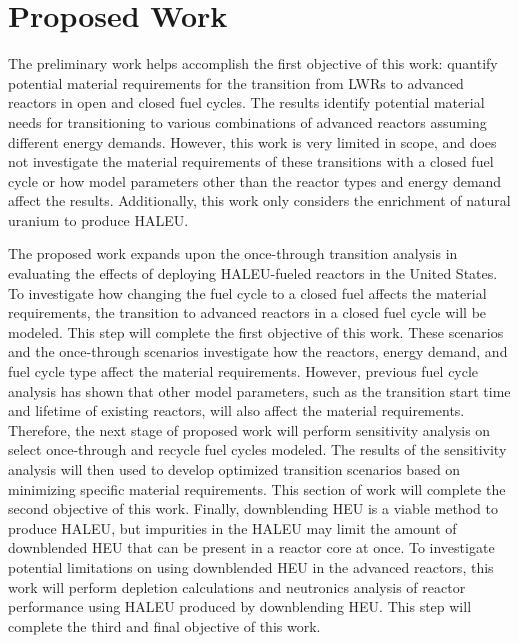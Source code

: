 \section{Proposed Work}
The preliminary work helps accomplish the first objective of this work: 
quantify potential material requirements for the transition from 
\glspl{LWR}
to advanced reactors in open and closed fuel cycles. The results identify 
potential material needs for transitioning to various combinations of 
advanced reactors assuming different energy demands. However, this work 
is very limited in scope, and does not investigate the material requirements 
of these transitions with a closed fuel cycle or how model parameters 
other 
than the reactor types and energy demand affect the results. Additionally, 
this work only considers the enrichment of natural uranium to produce 
\gls{HALEU}. 

The proposed work expands upon the once-through transition analysis in 
evaluating the effects of deploying \gls{HALEU}-fueled reactors in the 
United States. 
To investigate how changing the fuel cycle to a closed fuel affects the 
material requirements, the transition to advanced reactors in a closed fuel 
cycle will be modeled. This step will complete the first 
objective of this work. These scenarios and the once-through scenarios 
investigate how the reactors, energy demand, and fuel cycle type affect 
the material requirements. However, previous fuel cycle analysis has 
shown that other model parameters, such as the transition start time 
and lifetime of existing reactors, will also affect the material 
requirements. Therefore, 
the next stage of proposed work will perform sensitivity analysis on 
select once-through and recycle fuel cycles modeled. The results of the 
sensitivity 
analysis will then used to develop optimized transition scenarios based 
on minimizing specific material requirements. This section of work will 
complete the second objective of this work. Finally, downblending 
\gls{HEU} is a viable 
method to produce \gls{HALEU}, but impurities in the \gls{HALEU} may limit 
the amount of downblended \gls{HEU} that can be present in a reactor core 
at once. To investigate potential limitations on using downblended 
\gls{HEU} in the advanced reactors, this work will perform depletion 
calculations and neutronics analysis of reactor performance using 
\gls{HALEU} produced by 
downblending \gls{HEU}. This step will complete the third and final
objective of this work. 


